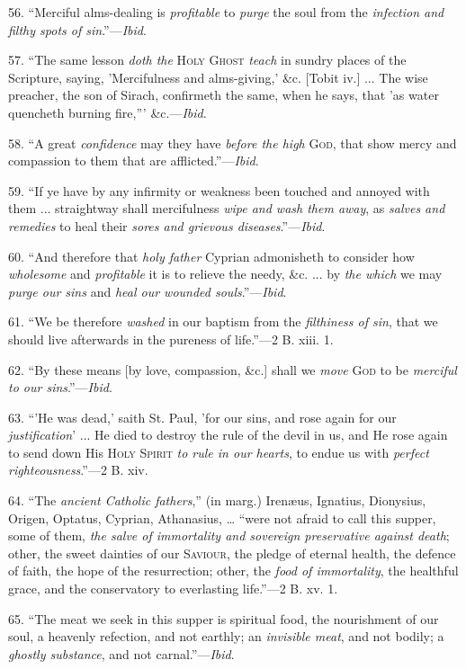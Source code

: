 56. ``Merciful alms-dealing is \emph{profitable} to \emph{purge}
the soul from the \emph{infection and filthy spots of sin}.''—\emph{Ibid}.

57. ``The same lesson \emph{doth the} H\textsc{oly} G\textsc{host}
\emph{teach} in sundry places of the Scripture, saying, 'Mercifulness and
alms-giving,' \&c. [Tobit iv.] ... The wise preacher, the son of
Sirach, confirmeth the same, when he says, that 'as water quencheth
burning fire,''' \&c.—\emph{Ibid}.

58. ``A great \emph{confidence} may they have \emph{before the
high} G\textsc{od}, that show mercy and
compassion to them that are afflicted.''—\emph{Ibid}.

59. ``If ye have by any infirmity or weakness been touched and
annoyed with them ... straightway shall mercifulness \emph{wipe and wash
them away}, as \emph{salves and remedies} to heal their \emph{sores
and grievous diseases}.''—\emph{Ibid}.

60. ``And therefore that \emph{holy father} Cyprian admonisheth
to consider how \emph{wholesome} and \emph{profitable} it is to
relieve the needy, \&c. ... by \emph{the which} we may \emph{purge our
sins} and \emph{heal our wounded souls}.''—\emph{Ibid}.

61. ``We be therefore \emph{washed} in our baptism from the \emph{filthiness
of sin}, that we should live afterwards in the pureness of
life.''—2 B. xiii. 1.

62. ``By these means [by love, compassion, \&c.] shall we \emph{move}
G\textsc{od} to be \emph{merciful to our sins}.''—\emph{Ibid}.

63. ``'He was dead,' saith St. Paul, 'for our sins, and rose
again for our \emph{justification}' ... He died to destroy the rule of
the devil in us, and He rose again to send down His H\textsc{oly}
S\textsc{pirit} \emph{to rule in our hearts}, to endue us
with \emph{perfect righteousness}.''—2 B. xiv.

64. ``The \emph{ancient Catholic fathers},'' (in marg.)
Irenæus, Ignatius, Dionysius, Origen, Optatus, Cyprian, Athanasius,
… ``were not afraid to call this supper, some of them, \emph{the
salve of immortality and sovereign preservative against death};
other, the sweet dainties of our S\textsc{aviour}, the
pledge of eternal health, the defence of faith, the hope of the
resurrection; other, the \emph{food of immortality}, the healthful
grace, and the conservatory to everlasting life.''—2 B. xv. 1.

65. ``The meat we seek in this supper is spiritual food, the
nourishment of our soul, a heavenly refection, and not earthly; an \emph{invisible
meat}, and not bodily; a \emph{ghostly substance}, and not
carnal.''—\emph{Ibid}.

